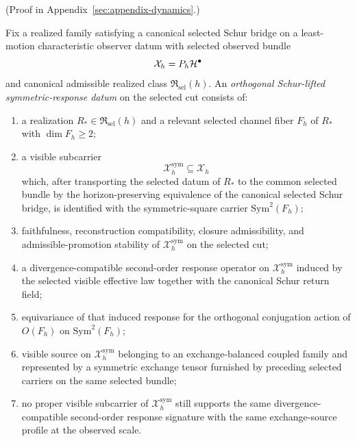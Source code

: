 (Proof in Appendix~\ref{sec:appendix-dynamics}.)

\begin{definition}
\label{def:orthogonal-schur-lifted-symmetric-response-package}
Fix a realized family satisfying a canonical selected Schur bridge on a
least-motion characteristic observer datum with selected observed bundle
\[
\mathcal X_h=P_h\mathcal{H}^\bullet
\]
and canonical admissible realized class \(\mathfrak R_{\mathrm{sel}}(h)\). An
\emph{orthogonal Schur-lifted symmetric-response datum} on the selected cut
consists of:
\begin{enumerate}[label=(\roman*), leftmargin=2em, itemsep=0.2em]
\item a realization \(R_\ast\in\mathfrak R_{\mathrm{sel}}(h)\) and a relevant
      selected channel fiber \(F_h\) of \(R_\ast\) with \(\dim F_h\ge 2\);
\item a visible subcarrier
      \[
      \mathcal X_h^{\mathrm{sym}}\subseteq \mathcal X_h
      \]
      which, after transporting the selected datum of \(R_\ast\) to the common
      selected bundle by the horizon-preserving equivalence of the canonical
      selected Schur bridge, is identified with the symmetric-square carrier
      \(\mathrm{Sym}^2(F_h)\);
\item faithfulness, reconstruction compatibility, closure admissibility, and
      admissible-promotion stability of
      \(\mathcal X_h^{\mathrm{sym}}\) on the selected cut;
\item a divergence-compatible second-order response operator on
      \(\mathcal X_h^{\mathrm{sym}}\) induced by the selected visible effective
      law together with the canonical Schur return field;
\item equivariance of that induced response for the orthogonal conjugation
      action of \(O(F_h)\) on \(\mathrm{Sym}^2(F_h)\);
\item visible source on \(\mathcal X_h^{\mathrm{sym}}\) belonging to an
      exchange-balanced coupled family and represented by a symmetric exchange
      tensor furnished by preceding selected carriers on the same selected
      bundle;
\item no proper visible subcarrier of \(\mathcal X_h^{\mathrm{sym}}\) still
      supports the same divergence-compatible second-order response signature
      with the same exchange-source profile at the observed scale.
\end{enumerate}
\end{definition}

